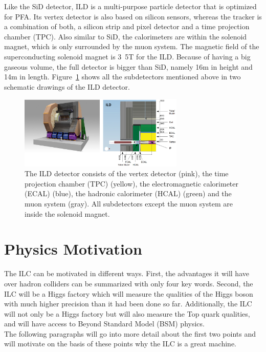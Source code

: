 Like the SiD detector, ILD is a multi-purpose particle detector that is optimized for PFA.
Its vertex detector is also based on silicon sensors, whereas the tracker is a combination of both, a silicon strip and pixel detector and a time projection chamber (TPC).
Also similar to SiD, the calorimeters are within the solenoid magnet, which is only surrounded by the muon system.
The magnetic field of the superconducting solenoid magnet is \unit{3.5}{T} for the ILD.
Because of having a big gaseous volume, the full detector is bigger than SiD, namely \unit{16}{m} in height and \unit{14}{m} in length.
Figure~\ref{fig:ILD} shows all the subdetectors mentioned above in two schematic drawings of the ILD detector.

\begin{figure}
\centering
\includegraphics[width=0.7\textwidth]{Figures/ILD.png}
\caption[Schematic drawing of the ILD detector]{The ILD detector consists of the vertex detector (pink), the time projection chamber (TPC) (yellow), the electromagnetic calorimeter (ECAL) (blue), the hadronic calorimeter (HCAL) (green) and the muon system (gray). All subdetectors except the muon system are inside the solenoid magnet.\cite[p. 34]{TDR1}}
\label{fig:ILD}
\end{figure}

\section{Physics Motivation}
\label{ILC:physicsmotivation}

The ILC can be motivated in different ways.
First, the advantages it will have over hadron colliders can be summarized with only four key words.
Second, the ILC will be a Higgs factory which will measure the qualities of the Higgs boson with much higher precision than it had been done so far.
Additionally, the ILC will not only be a Higgs factory but will also measure the Top quark qualities, and will have access to Beyond Standard Model (BSM) physics.\\
The following paragraphs will go into more detail about the first two points and will motivate on the basis of these points why the ILC is a great machine.

